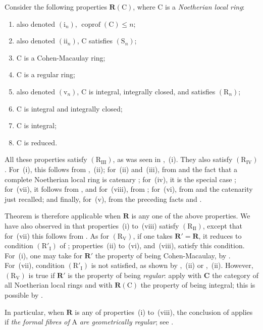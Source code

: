 \begin{examples}[7.5.3]
\label{IV.7.5.3}
Consider the following properties $\boldsymbol{R}(\mathrm{C})$, where $\mathrm{C}$ is a \emph{Noetherian local ring}:
\begin{enumerate}[label=(\roman*)]
  \item also denoted $(\mathrm{i}_n)$, $\operatorname{coprof}(\mathrm{C})\leqslant n$;
  \item also denoted $(\mathrm{ii}_n)$, $\mathrm{C}$ satisfies $(\mathrm{S}_n)$;
  \item $\mathrm{C}$ is a Cohen-Macaulay ring;
  \item $\mathrm{C}$ is a regular ring;
  \item also denoted $(\mathrm{v}_n)$, $\mathrm{C}$ is integral, integrally closed, and satisfies $(\mathrm{R}_n)$;
  \item $\mathrm{C}$ is integral and integrally closed;
  \item $\mathrm{C}$ is integral;
  \item $\mathrm{C}$ is reduced.
\end{enumerate}
All these properties satisfy $(\mathrm{R}_{\mathrm{III}})$, as was seen in ,~(i). They also satisfy $(\mathrm{R}_{\mathrm{IV}})$. For~(i), this follows from ,~(ii); for~(ii) and~(iii), from  and the fact that a complete Noetherian local ring is catenary ; for~(iv), it is the special case ; for~(vii), it follows from , and for~(viii), from ; for~(vi), from  and the catenarity just recalled; and finally, for~(v), from the preceding facts and .

Theorem  is therefore applicable when $\boldsymbol{R}$ is any one of the above properties. We have also observed in  that properties~(i) to~(viii) satisfy $(\mathrm{R}_{\mathrm{II}})$, except that for~(vii) this follows from . As for $(\mathrm{R}_{\mathrm{V}})$, if one takes $\boldsymbol{R}'=\boldsymbol{R}$, it reduces to condition $(\mathrm{R}'_{\mathrm{I}})$ of ; properties~(ii) to~(vi), and~(viii), satisfy this condition. For~(i), one may take for $\boldsymbol{R}'$ the property of being Cohen-Macaulay, by . For~(vii), condition $(\mathrm{R}'_{\mathrm{I}})$ is not satisfied, as shown by ,~(ii) or ,~(ii). However, $(\mathrm{R}_{\mathrm{V}})$ is true if $\boldsymbol{R}'$ is the property of being \emph{regular}: apply  with $\boldsymbol{C}$ the category of all Noetherian local rings and with $\boldsymbol{R}(\mathrm{C})$ the property of being integral; this is possible by .

In particular, when $\boldsymbol{R}$ is any of properties~(i) to~(viii), the conclusion of  applies if \emph{the formal fibres of} $\mathrm{A}$ \emph{are geometrically regular}; see .
\end{examples}

